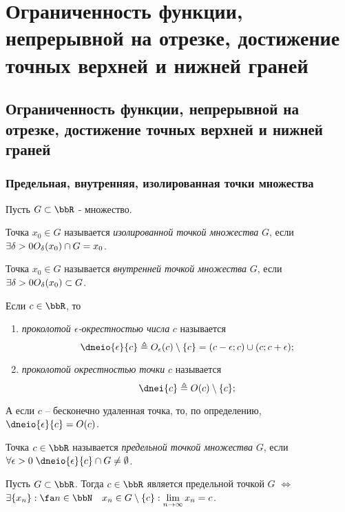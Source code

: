 \chapter{Ограниченность функции, непрерывной на отрезке, достижение точных верхней и нижней граней}

\section{Ограниченность функции, непрерывной на отрезке, достижение точных верхней и нижней граней}

\subsection{Предельная, внутренняя, изолированная точки множества}
Пусть $G \subset \bbR$ - множество.
\begin{defn}
Точка $x_0 \in G$ называется \textit{изолированной точкой множества} $G$, если $\exists \delta >0\\ O_\delta(x_0) \cap G = x_0$.
\end{defn}

\begin{defn}
Точка $x_0 \in G$ называется \textit{внутренней точкой множества} $G$, если $\exists \delta >0\\ O_\delta(x_0) \subset G$.
\end{defn}

\begin{defn}
Если $c \in \bbR$, то 
\begin{enumerate}
\item
\textit{проколотой $\epsilon$-окрестностью числа} $c$ называется $$\dneio{\epsilon}{c} \triangleq O_\epsilon(c)\setminus\{c\}=(c-\epsilon;c)\cup(c;c+\epsilon);$$
\item
\textit{проколотой окрестностью точки} $c$ называется $$\dnei{c} \triangleq O(c)\setminus \{c\};$$
\end{enumerate}
\textbullet\; А если $c$ -- бесконечно удаленная точка, то, по определению, $\dneio{\epsilon}{c}= O (c) $.
\end{defn}

\begin{defn}
Точка $c \in \bbR$ называется \textit{предельной точкой множества} $G$, если $\forall \epsilon >0 \;\dneio{\epsilon}{c} \cap G \ne \emptyset$.
\end{defn}

\begin{thm}
\label{exp13}
Пусть $G \subset \bbR$. Тогда $c \in \bbR$ является предельной точкой $G$ $\Longleftrightarrow$ $\\ \exists \{x_n\}: \fa n \in \bbN \quad x_n \in G\setminus\{c\}: \lim_{n \to \infty}\limits x_n = c$. 
\end{thm}
